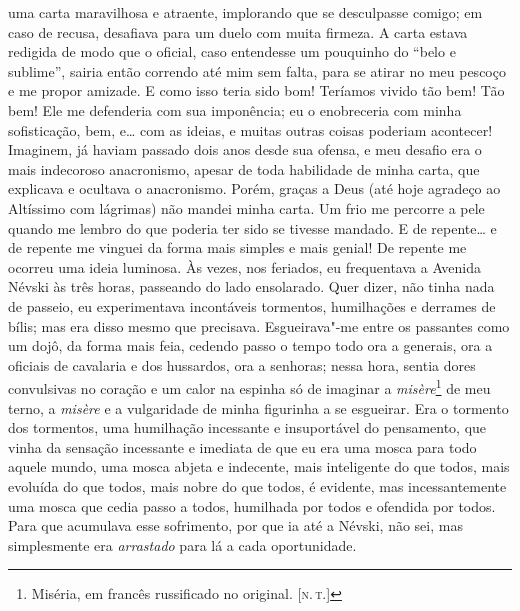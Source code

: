 uma carta maravilhosa e atraente, implorando que se desculpasse comigo;
em caso de recusa, desafiava para um duelo com muita firmeza. A carta
estava redigida de modo que o oficial, caso entendesse um pouquinho do
``belo e sublime'', sairia então correndo até mim sem falta, para se
atirar no meu pescoço e me propor amizade. E como isso teria sido bom!
Teríamos vivido tão bem! Tão bem! Ele me defenderia com sua imponência;
eu o enobreceria com minha sofisticação, bem, e\ldots{} com as ideias, e
muitas outras coisas poderiam acontecer! Imaginem, já haviam passado
dois anos desde sua ofensa, e meu desafio era o mais indecoroso
anacronismo, apesar de toda habilidade de minha carta, que explicava e
ocultava o anacronismo. Porém, graças a Deus (até hoje agradeço ao
Altíssimo com lágrimas) não mandei minha carta. Um frio me percorre a
pele quando me lembro do que poderia ter sido se tivesse mandado. E de
repente\ldots{} e de repente me vinguei da forma mais simples e mais genial!
De repente me ocorreu uma ideia luminosa. Às vezes, nos feriados, eu
frequentava a Avenida Névski às três horas, passeando do lado
ensolarado. Quer dizer, não tinha nada de passeio, eu experimentava
incontáveis tormentos, humilhações e derrames de bílis; mas era disso
mesmo que precisava. Esgueirava"-me entre os passantes como um dojô, da
forma mais feia, cedendo passo o tempo todo ora a generais, ora a
oficiais de cavalaria e dos hussardos, ora a senhoras; nessa hora,
sentia dores convulsivas no coração e um calor na espinha só de imaginar
a \emph{misère}\footnote{Miséria, em francês russificado no original.
  {[}\textsc{n.\,t.}{]}} de meu terno, a \emph{misère} e a vulgaridade de minha
figurinha a se esgueirar. Era o tormento dos tormentos, uma humilhação
incessante e insuportável do pensamento, que vinha da sensação
incessante e imediata de que eu era uma mosca para todo aquele mundo,
uma mosca abjeta e indecente, mais inteligente do que todos, mais
evoluída do que todos, mais nobre do que todos, é evidente, mas
incessantemente uma mosca que cedia passo a todos, humilhada por todos e
ofendida por todos. Para que acumulava esse sofrimento, por que ia até a
Névski, não sei, mas simplesmente era \emph{arrastado} para lá a cada
oportunidade.

